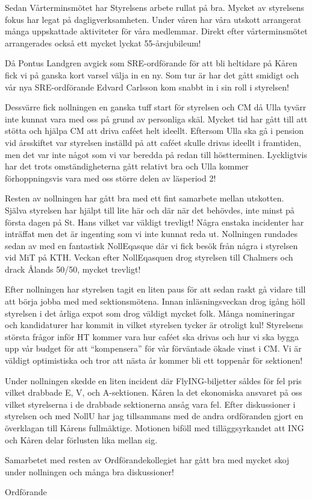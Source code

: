 \documentclass[../_main/handlingar.tex]{subfiles}
\begin{document}

Sedan Vårterminsmötet har Styrelsens arbete rullat på bra. Mycket av styrelsens fokus har legat på dagligverksamheten. Under våren har våra utskott arrangerat många uppskattade aktiviteter för våra medlemmar. Direkt efter vårterminsmötet arrangerades också ett mycket lyckat 55-årsjubileum!

Då Pontus Landgren avgick som SRE-ordförande för att bli heltidare på Kåren fick vi på ganska kort varsel välja in en ny. Som tur är har det gått smidigt och vår nya SRE-ordförande Edvard Carlsson kom snabbt in i sin roll i styrelsen!

Dessvärre fick nollningen en ganska tuff start för styrelsen och CM då Ulla tyvärr inte kunnat vara med oss på grund av personliga skäl. Mycket tid har gått till att stötta och hjälpa CM att driva caféet helt ideellt. Eftersom Ulla ska gå i pension vid årsskiftet var styrelsen inställd på att caféet skulle drivas ideellt i framtiden, men det var inte något som vi var beredda på redan till höstterminen. Lyckligtvis har det trots omständigheterna gått relativt bra och Ulla kommer förhoppningsvis vara med oss större delen av läsperiod 2!

Resten av nollningen har gått bra med ett fint samarbete mellan utskotten. Själva styrelsen har hjälpt till lite här och där när det behövdes, inte minst på första dagen på St. Hans vilket var väldigt trevligt! Några enstaka incidenter har inträffat men det är ingenting som vi inte kunnat reda ut. Nollningen rundades sedan av med en fantastisk NollEqasque där vi fick besök från några i styrelsen vid MiT på KTH. Veckan efter NollEqasquen drog styrelsen till Chalmers och drack Ålands 50/50, mycket trevligt!

Efter nollningen har styrelsen tagit en liten paus för att sedan raskt gå vidare till att börja jobba med med sektionsmötena. Innan inläsningsveckan drog igång höll styrelsen i det årliga expot som drog väldigt mycket folk. Många nomineringar och kandidaturer har kommit in vilket styrelsen tycker är otroligt kul! Styrelsens största frågor inför HT kommer vara hur caféet ska drivas och hur vi ska bygga upp vår budget för att ``kompensera'' för vår förväntade ökade vinst i CM. Vi är väldigt optimistiska och tror att nästa år kommer bli ett toppenår för sektionen!

Under nollningen skedde en liten incident där FlyING-biljetter såldes för fel pris vilket drabbade E, V, och A-sektionen. Kåren la det ekonomiska ansvaret på oss vilket styrelserna i de drabbade sektionerna ansåg vara fel. Efter diskussioner i styrelsen och med NollU har jag tillsammans med de andra ordföranden gjort en överklagan till Kårens fullmäktige. Motionen biföll med tilläggsyrkandet att ING och Kåren delar förlusten lika mellan sig.

Samarbetet med resten av Ordförandekollegiet har gått bra med mycket skoj under nollningen och många bra diskussioner!

\begin{signatures}{1}
    \mvh
    \signature{\ordf}{Ordförande}
\end{signatures}
\end{document}
